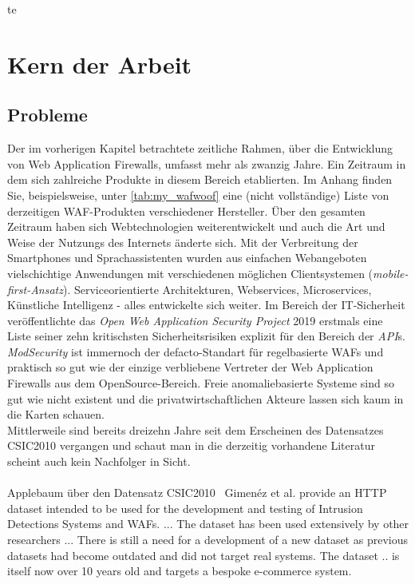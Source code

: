 te\chapter{Kern der Arbeit}


\section{Probleme}

Der im vorherigen Kapitel betrachtete zeitliche Rahmen, über die Entwicklung von Web Application Firewalls, umfasst mehr als zwanzig Jahre. Ein Zeitraum in dem sich zahlreiche Produkte in diesem Bereich etablierten. Im Anhang finden Sie, beispielsweise, unter \ref{tab:my_wafwoof} eine (nicht vollständige) Liste von derzeitigen WAF-Produkten verschiedener Hersteller. Über den gesamten Zeitraum haben sich Webtechnologien weiterentwickelt und auch die Art und Weise der Nutzungs des Internets änderte sich. Mit der Verbreitung der Smartphones und Sprachassistenten wurden aus einfachen Webangeboten vielschichtige Anwendungen mit verschiedenen möglichen Clientsystemen (\emph{mobile-first-Ansatz}). Serviceorientierte Architekturen, Webservices, Microservices, Künstliche Intelligenz - alles entwickelte sich weiter. Im Bereich der IT-Sicherheit veröffentlichte das \emph{Open Web Application Security Project} 2019 erstmals eine Liste seiner zehn kritischsten Sicherheitsrisiken explizit für den Bereich der \emph{API}s. \emph{ModSecurity} ist immernoch der defacto-Standart für regelbasierte WAFs und praktisch so gut wie der einzige verbliebene Vertreter der Web Application Firewalls aus dem OpenSource-Bereich. Freie anomaliebasierte Systeme sind so gut wie nicht existent und die privatwirtschaftlichen Akteure lassen sich kaum in die Karten schauen. \\
Mittlerweile sind bereits dreizehn Jahre seit dem Erscheinen des Datensatzes CSIC2010 vergangen und schaut man in die derzeitig vorhandene Literatur scheint auch kein Nachfolger in Sicht. \\\\

\textcolor{bhtGray}{ Applebaum über den Datensatz CSIC2010~\cite{Applebaum2021}} Gimenéz et al. provide an HTTP dataset intended to be used for the development and testing of Intrusion Detections Systems and WAFs. ... The dataset has been used extensively by other researchers ... There is still a need for a development of a new dataset as previous datasets had become outdated and did not target real systems. The dataset .. is itself now over 10 years old and targets a bespoke e-commerce system. \\\\


